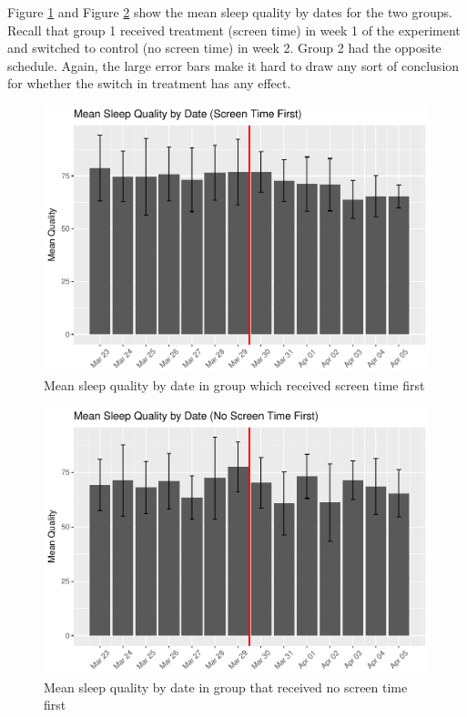 \documentclass[]{article}
\begin{document}
Figure \ref{fig:quality_by_date_group1_fig} and Figure
\ref{fig:quality_by_date_group2_fig} show the mean sleep quality by
dates for the two groups. Recall that group 1 received treatment (screen
time) in week 1 of the experiment and switched to control (no screen
time) in week 2. Group 2 had the opposite schedule. Again, the large
error bars make it hard to draw any sort of conclusion for whether the
switch in treatment has any effect.

\begin{figure}
\centering
\includegraphics{report_files/figure-latex/quality_by_date_group1_fig-1.pdf}
\caption{\label{fig:quality_by_date_group1_fig} Mean sleep quality by
date in group which received screen time first}
\end{figure}

\begin{figure}
\centering
\includegraphics{report_files/figure-latex/quality_by_date_group2_fig-1.pdf}
\caption{\label{fig:quality_by_date_group2_fig} Mean sleep quality by
date in group that received no screen time first}
\end{figure}
\end{document}
